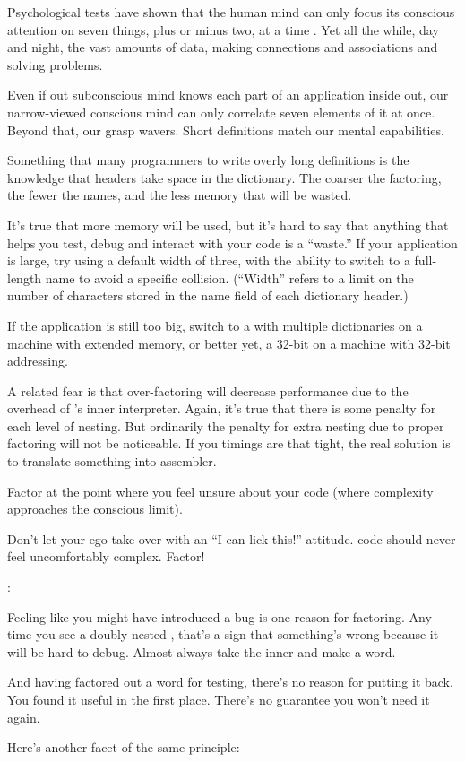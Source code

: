 Psychological tests have shown that the human mind can only focus its
conscious attention on seven things, plus or minus two, at a time
\cite{miller56}. Yet all the while, day and night, the vast amounts of
data, making connections and associations and solving problems.

Even if out subconscious mind knows each part of an application inside
out, our narrow-viewed conscious mind can only correlate seven
elements of it at once. Beyond that, our grasp wavers. Short
definitions match our mental capabilities.

Something that many \Forth{} programmers to write overly long
definitions is the knowledge that headers take space in the
dictionary. The coarser the factoring, the fewer the names, and the
less memory that will be wasted.

It's true that more memory will be used, but it's hard to say that
anything that helps you test, debug and interact with your code is a
``waste.'' If your application is large, try using a default width of
three, with the ability to switch to a full-length name to avoid a
specific collision. (``Width'' refers to a limit on the number of
characters stored in the name field of each dictionary header.)

If the application is still too big, switch to a \Forth{} with
multiple dictionaries on a machine with extended memory, or better
yet, a 32-bit \Forth{} on a machine with 32-bit addressing.

A related fear is that over-factoring will decrease performance due to
the overhead of \Forth{}'s inner interpreter. Again, it's true that
there is some penalty for each level of nesting. But ordinarily the
penalty for extra nesting due to proper factoring will not be
noticeable. If you timings are that tight, the real solution is to
translate something into assembler.

\begin{tip}
Factor at the point where you feel unsure about your code (where
complexity approaches the conscious limit).
\end{tip}
Don't let your ego take over with an ``I can lick this!'' attitude.
\Forth{} code should never feel uncomfortably complex. Factor!

\begin{interview}
:

\begin{tfquot}
Feeling like you might have introduced a bug is one reason for
factoring. Any time you see a doubly-nested , that's a
sign that something's wrong because it will be hard to debug. Almost
always take the inner  and make a word.

And having factored out a word for testing, there's no reason for
putting it back. You found it useful in the first place. There's no
guarantee you won't need it again.
\end{tfquot}
\end{interview}
Here's another facet of the same principle:

